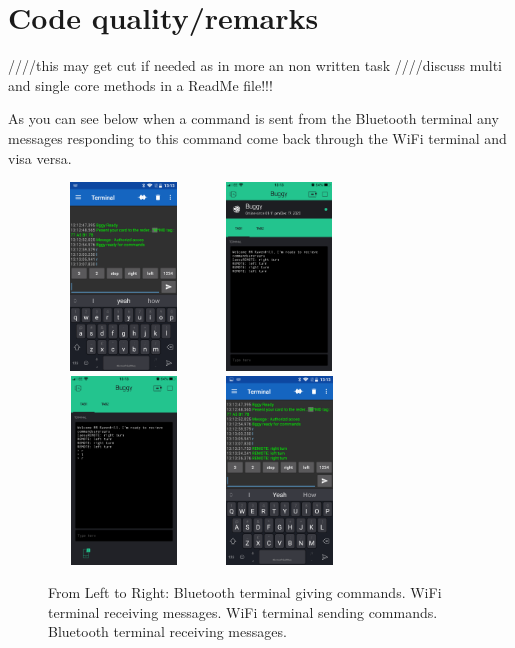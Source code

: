 \documentclass[8pt, a4paper]{article}
\begin{document}
 
 

	

\section{Code quality/remarks} ////this may get cut if needed as in more an non written task
////discuss multi and single core methods in a ReadMe file!!!


As you can see below when a command is sent from the Bluetooth terminal any messages responding to this command come back through the WiFi terminal and visa versa. 

\begin{figure}[H]
	\centering
	\includegraphics[height=5.0cm, width=4.0cm]{BLE_term}
	\includegraphics[height=5.0cm, width=4.0cm]{blynk_term2}
	\includegraphics[height=5.0cm, width=4.0cm]{blynk_term}
	\includegraphics[height=5.0cm, width=4.0cm]{BLE_term2}
	\caption{From Left to Right: Bluetooth terminal giving commands. WiFi terminal receiving messages. WiFi terminal sending commands. Bluetooth terminal receiving messages.}			
\end{figure}
\end{document}
